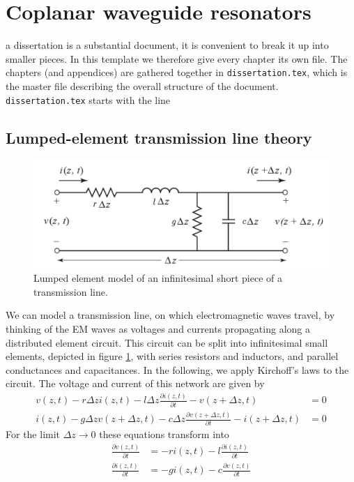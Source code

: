 \section{Coplanar waveguide resonators}

 a dissertation is a substantial document, it is convenient to break it up into smaller pieces.
In this template we therefore give every chapter its own file. The chapters (and appendices) are gathered together in \texttt{dissertation.tex}, which is the master file describing the overall structure of the document. \texttt{dissertation.tex} starts with the line

\subsection{Lumped-element transmission line theory}
\begin{figure}
	\centering
	\includegraphics[width=0.4\linewidth]{chapter-theory/figs-RF/TL_lumped}
	\caption{Lumped element model of an infinitesimal short piece of a transmission line.}
	\label{fig:tllumped}
\end{figure}
We can model a transmission line, on which electromagnetic waves travel, by thinking of the EM waves as voltages and currents propagating along a distributed element circuit.
This circuit can be split into infinitesimal small elements, depicted in figure \ref{fig:tllumped}, with series resistors and inductors, and parallel conductances and capacitances.
In the following, we apply Kirchoff's laws to the circuit.
The voltage and current of this network are given by
\begin{align}
v(z,t) - r\Delta z i(z,t) - l\Delta z\frac{\partial i(z,t)}{\partial t}-v(z+\Delta z,t) &=0 \\%
i(z,t) - g\Delta z v(z+\Delta z, t) - c\Delta z\frac{\partial v(z+\Delta z,t)}{\partial t} - i(z+\Delta z,t) &=0
\end{align}
For the limit $\Delta z\rightarrow0$ these equations transform into 
\begin{align}
\frac{\partial v(z,t)}{\partial t} &= -ri(z,t)-l\frac{\partial i(z,t)}{\partial t} \\%
\frac{\partial i(z,t)}{\partial t} &= -gi(z,t)-c\frac{\partial v(z,t)}{\partial t}
\end{align}

